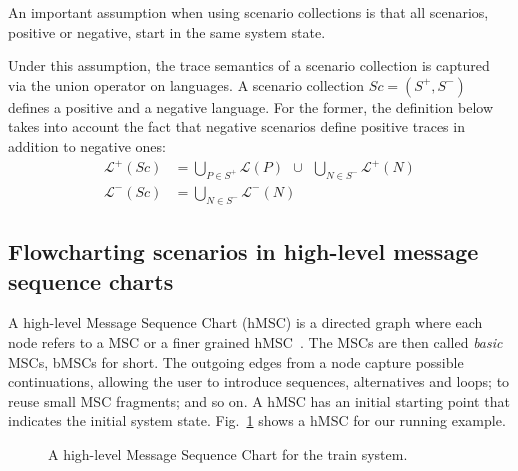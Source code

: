 An important assumption when using scenario collections is that all scenarios, positive or negative, start in the same system state.

Under this assumption, the trace semantics of a scenario collection is captured via the union operator on languages. A scenario collection $Sc = (S^+,S^-)$ defines a positive and a negative language. For the former, the definition below takes into account the fact that negative scenarios define positive traces in addition to negative ones:
\begin{align*}
\mathcal{L}^+(Sc) &= \bigcup_{P \in S^+} \mathcal{L}(P)~~\cup~~\bigcup_{N \in S^{-}} \mathcal{L}^{+}(N) \\
\mathcal{L}^-(Sc) &= \bigcup_{N \in S^-} \mathcal{L}^{-}(N)
\end{align*}

\subsection{Flowcharting scenarios in high-level message sequence charts\label{subsection:background-hmsc}}

A high-level Message Sequence Chart (hMSC) is a directed graph where each node refers to a MSC or a finer grained hMSC~\cite{ITU:1996}. The MSCs are then called \emph{basic} MSCs, bMSCs for short. The outgoing edges from a node capture possible continuations, allowing the user to introduce sequences, alternatives and loops; to reuse small MSC fragments; and so on. A hMSC has an initial starting point that indicates the initial system state. Fig.~\ref{image:train-hmsc} shows a hMSC for our running example.

\vspace{0.4cm}
\begin{figure}[H]\centering
{}
\caption{A high-level Message Sequence Chart for the train system.\label{image:train-hmsc}}
\end{figure}


